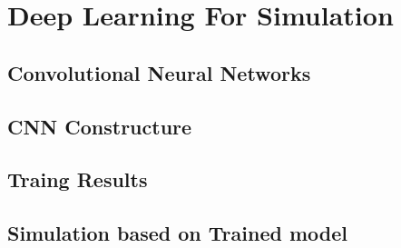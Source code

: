 \chapter{Deep Learning For Simulation}


\section{Convolutional Neural Networks}

\section{CNN Constructure}

\section{Traing Results}

\section{Simulation based on Trained model}